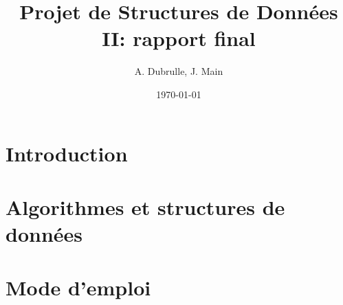 \documentclass[a4paper, 12pt]{article}
\title{Projet de Structures de Données II: rapport final}
\author{A. Dubrulle, J. Main}
\date{\today}
\theoremstyle{definition} \newtheorem{df}{D\'{e}finition}[section]
\theoremstyle{definition} \newtheorem{ex}[df]{Exemple}
\theoremstyle{definition} \newtheorem{thm}[df]{Th\'{e}or\`{e}me}
\theoremstyle{definition} \newtheorem{cor}[df]{Corollaire}
\theoremstyle{definition} \newtheorem{lem}[df]{Lemme}
\theoremstyle{definition} \newtheorem{obs}[df]{Observation}
\theoremstyle{definition} \newtheorem{prop}[df]{Proposition}
\theoremstyle{definition} \newtheorem{rem}[df]{Remarque}
\begin{document}
\maketitle
\tableofcontents
\section{Introduction}


\section{Algorithmes et structures de données}



\section{Mode d'emploi}


%
\end{document}

